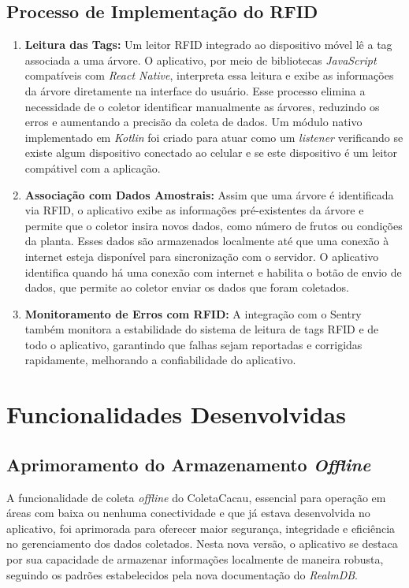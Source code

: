 \subsection{Processo de Implementação do RFID}
\begin{enumerate}
    \item \textbf{Leitura das Tags:} Um leitor RFID integrado ao dispositivo móvel lê a tag associada a uma árvore. O aplicativo, por meio de bibliotecas \textit{JavaScript} compatíveis com \textit{React Native}, interpreta essa leitura e exibe as informações da árvore diretamente na interface do usuário. Esse processo elimina a necessidade de o coletor identificar manualmente as árvores, reduzindo os erros e aumentando a precisão da coleta de dados. Um módulo nativo implementado em \textit{Kotlin} foi criado para atuar como um \textit{listener} verificando se existe algum dispositivo conectado ao celular e se este dispositivo é um leitor compátivel com a aplicação.

    \item \textbf{Associação com Dados Amostrais:} Assim que uma árvore é identificada via RFID, o aplicativo exibe as informações pré-existentes da árvore e permite que o coletor insira novos dados, como número de frutos ou condições da planta. Esses dados são armazenados localmente até que uma conexão à internet esteja disponível para sincronização com o servidor. O aplicativo identifica quando há uma conexão com internet e habilita o botão de envio de dados, que permite ao coletor enviar os dados que foram coletados.

    \item \textbf{Monitoramento de Erros com RFID:} A integração com o Sentry também monitora a estabilidade do sistema de leitura de tags RFID e de todo o aplicativo, garantindo que falhas sejam reportadas e corrigidas rapidamente, melhorando a confiabilidade do aplicativo.
\end{enumerate}

\section{Funcionalidades Desenvolvidas}

\subsection{Aprimoramento do Armazenamento \textit{Offline}}
A funcionalidade de coleta \textit{offline} do ColetaCacau, essencial para operação em áreas com baixa ou nenhuma conectividade e que já estava desenvolvida no aplicativo, foi aprimorada para oferecer maior segurança, integridade e eficiência no gerenciamento dos dados coletados. Nesta nova versão, o aplicativo se destaca por sua capacidade de armazenar informações localmente de maneira robusta, seguindo os padrões estabelecidos pela nova documentação do \textit{RealmDB}.

